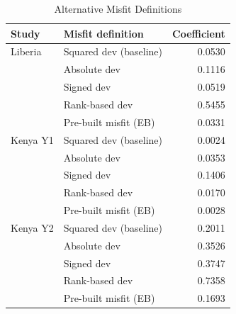 \begin{table}[htbp]
\centering\small
\caption{Alternative Misfit Definitions}
\label{tab:alt_misfit}
\begin{tabular}{llr}
\toprule
Study & Misfit definition & Coefficient \\
\midrule
Liberia & Squared dev (baseline) & 0.0530 \\
 & Absolute dev & 0.1116 \\
 & Signed dev & 0.0519 \\
 & Rank-based dev & 0.5455 \\
 & Pre-built misfit (EB) & 0.0331 \\
\addlinespace
Kenya Y1 & Squared dev (baseline) & 0.0024 \\
 & Absolute dev & 0.0353 \\
 & Signed dev & 0.1406 \\
 & Rank-based dev & 0.0170 \\
 & Pre-built misfit (EB) & 0.0028 \\
\addlinespace
Kenya Y2 & Squared dev (baseline) & 0.2011 \\
 & Absolute dev & 0.3526 \\
 & Signed dev & 0.3747 \\
 & Rank-based dev & 0.7358 \\
 & Pre-built misfit (EB) & 0.1693 \\
\bottomrule
\end{tabular}
\par\smallskip{}
\end{table}